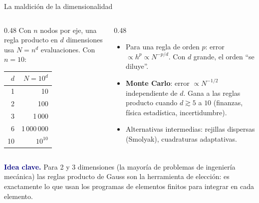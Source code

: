 \documentclass[aspectratio=169,10pt]{beamer}
\newcommand{\ideaclave}[1]{\begin{clave}\small\textbf{\textcolor{navy}{Idea clave.}} #1\end{clave}}
\begin{document}
\begin{frame}{La maldici\'on de la dimensionalidad}
\begin{columns}[T]
\begin{column}{0.48\textwidth}
\small
Con $n$ nodos por eje, una regla producto en $d$ dimensiones usa $N=n^d$ evaluaciones. Con $n=10$:\\[4pt]
\centering
\begin{tabular}{@{}rr@{}}
\toprule
$d$ & $N=10^d$\\
\midrule
1 & 10\\
2 & 100\\
3 & 1\,000\\
6 & 1\,000\,000\\
10 & $10^{10}$\\
\bottomrule
\end{tabular}
\end{column}
\begin{column}{0.48\textwidth}
\small
\begin{itemize}
\item Para una regla de orden $p$: error $\propto h^p\propto N^{-p/d}$. Con $d$ grande, el orden ``se diluye''.
\item \textbf{Monte Carlo}: error $\propto N^{-1/2}$ \alert{independiente de $d$}. Gana a las reglas producto cuando $d\gtrsim 5$ a $10$ (finanzas, f\'isica estad\'istica, incertidumbre).
\item Alternativas intermedias: rejillas dispersas (Smolyak), cuadraturas adaptativas.
\end{itemize}
\end{column}
\end{columns}
\ideaclave{Para 2 y 3 dimensiones (la mayor\'ia de problemas de ingenier\'ia mec\'anica) las reglas producto de Gauss son la herramienta de elecci\'on: es exactamente lo que usan los programas de \alert{elementos finitos} para integrar en cada elemento.}
\end{frame}

\end{document}

